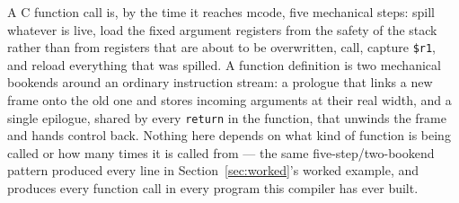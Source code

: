 \documentclass[11pt,a4paper]{article}
\begin{document}
A C function call is, by the time it reaches mcode, five mechanical steps: spill whatever
is live, load the fixed argument registers from the safety of the stack rather than from
registers that are about to be overwritten, call, capture \texttt{\$r1}, and reload
everything that was spilled. A function definition is two mechanical bookends around an
ordinary instruction stream: a prologue that links a new frame onto the old one and stores
incoming arguments at their real width, and a single epilogue, shared by every
\texttt{return} in the function, that unwinds the frame and hands control back. Nothing
here depends on what kind of function is being called or how many times it is called from
--- the same five-step/two-bookend pattern produced every line in
Section~\ref{sec:worked}'s worked example, and produces every function call in every
program this compiler has ever built.
\end{document}
